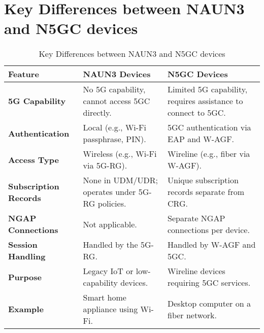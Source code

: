 \chapter{Key Differences between \acs{NAUN3} and \acs{N5GC} devices}
\label{appendix-a}
\begin{table}[ht]
    \centering
    \caption{Key Differences between \acs{NAUN3} and \acs{N5GC} devices}
    \label{tab:Key Differences between NAUN3 and N5GC devices}
    \begin{tabularx}{\textwidth} { 
      | >{\raggedright\arraybackslash}X 
      | >{\raggedright\arraybackslash}X 
      | >{\raggedright\arraybackslash}X | }
        \hline
        \textbf{Feature} & \textbf{\ac{NAUN3} Devices} & \textbf{\ac{N5GC} Devices} \\
        \hline
        \textbf{\ac{5G} Capability} & No \ac{5G} capability, cannot access \ac{5GC} directly. & Limited \ac{5G} capability, requires assistance to connect to \ac{5GC}.\\
        \hline
        \textbf{Authentication} & Local (e.g., Wi-Fi passphrase, \ac{PIN}). & \ac{5GC} authentication via \ac{EAP} and \ac{W-AGF}.\\
        \hline
        \textbf{Access Type} & Wireless (e.g., Wi-Fi via \ac{5G-RG}). & Wireline (e.g., fiber via \ac{W-AGF}).\\
        \hline
        \textbf{Subscription Records} & None in \ac{UDM}/\ac{UDR}; operates under \ac{5G-RG} policies. & Unique subscription records separate from \ac{CRG}.\\
        \hline
        \textbf{\ac{NGAP} Connections} & Not applicable. & Separate \ac{NGAP} connections per device.\\
        \hline
        \textbf{Session Handling} & Handled by the \ac{5G-RG}. & Handled by \ac{W-AGF} and \ac{5GC}.\\
        \hline
        \textbf{Purpose} & Legacy \ac{IoT} or low-capability devices. & Wireline devices requiring \ac{5GC} services.\\
        \hline
        \textbf{Example} & Smart home appliance using Wi-Fi. & Desktop computer on a fiber network.\\
        \hline
    \end{tabularx}
\end{table}